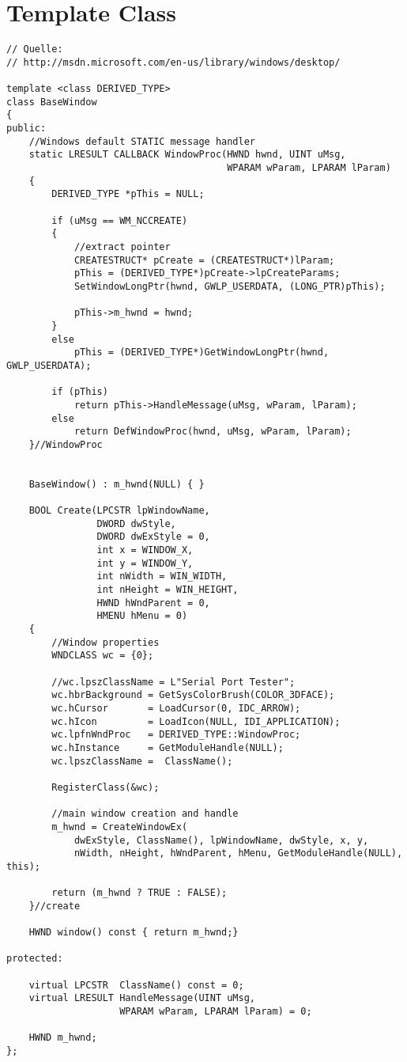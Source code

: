 \section{Template Class}\label{TemplateClass}
\begin{lstlisting}	
// Quelle:
// http://msdn.microsoft.com/en-us/library/windows/desktop/

template <class DERIVED_TYPE> 
class BaseWindow
{
public:
	//Windows default STATIC message handler
	static LRESULT CALLBACK WindowProc(HWND hwnd, UINT uMsg,
                                       WPARAM wParam, LPARAM lParam)
	{
		DERIVED_TYPE *pThis = NULL;

		if (uMsg == WM_NCCREATE)
		{
			//extract pointer
			CREATESTRUCT* pCreate = (CREATESTRUCT*)lParam;
			pThis = (DERIVED_TYPE*)pCreate->lpCreateParams;
			SetWindowLongPtr(hwnd, GWLP_USERDATA, (LONG_PTR)pThis);

			pThis->m_hwnd = hwnd;
		}
		else
			pThis = (DERIVED_TYPE*)GetWindowLongPtr(hwnd, GWLP_USERDATA);

		if (pThis)
			return pThis->HandleMessage(uMsg, wParam, lParam);
		else
			return DefWindowProc(hwnd, uMsg, wParam, lParam);
	}//WindowProc

    
	BaseWindow() : m_hwnd(NULL) { }

	BOOL Create(LPCSTR lpWindowName,
				DWORD dwStyle,
				DWORD dwExStyle = 0,
				int x = WINDOW_X,
				int y = WINDOW_Y,
				int nWidth = WIN_WIDTH,
				int nHeight = WIN_HEIGHT,
				HWND hWndParent = 0,
				HMENU hMenu = 0)
    {
		//Window properties
		WNDCLASS wc = {0};
		
		//wc.lpszClassName = L"Serial Port Tester";
		wc.hbrBackground = GetSysColorBrush(COLOR_3DFACE);
		wc.hCursor       = LoadCursor(0, IDC_ARROW);
		wc.hIcon		 = LoadIcon(NULL, IDI_APPLICATION);
		wc.lpfnWndProc   = DERIVED_TYPE::WindowProc;
		wc.hInstance     = GetModuleHandle(NULL);
		wc.lpszClassName =  ClassName();

		RegisterClass(&wc);

		//main window creation and handle
		m_hwnd = CreateWindowEx(
			dwExStyle, ClassName(), lpWindowName, dwStyle, x, y,
			nWidth, nHeight, hWndParent, hMenu, GetModuleHandle(NULL), this);

        return (m_hwnd ? TRUE : FALSE);
    }//create

	HWND window() const { return m_hwnd;}

protected:

    virtual LPCSTR  ClassName() const = 0;
    virtual LRESULT HandleMessage(UINT uMsg,
                    WPARAM wParam, LPARAM lParam) = 0;

    HWND m_hwnd;
};
\end{lstlisting}	


